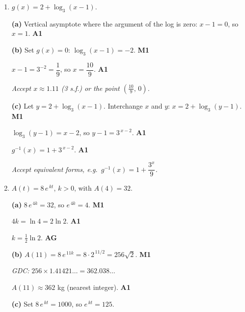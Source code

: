 \documentclass[12pt, twoside]{article}
\begin{document}
\begin{enumerate}[itemsep=0.3cm]
\newpage

\item[3.] [Maximum mark: 6]

$g(x) = 2 + \log_{3}(x - 1)$.

\medskip

\textbf{(a)} Vertical asymptote where the argument of the log is zero:
$x - 1 = 0$, so $x = 1$. \hfill \textbf{A1}

\medskip

\textbf{(b)} Set $g(x) = 0$: $\log_{3}(x - 1) = -2$. \hfill \textbf{M1}

$x - 1 = 3^{-2} = \dfrac{1}{9}$, so $x = \dfrac{10}{9}$. \hfill \textbf{A1}

\emph{Accept $x \approx 1.11$ (3 s.f.) or the point $(\tfrac{10}{9},\, 0)$.}

\medskip

\textbf{(c)} Let $y = 2 + \log_{3}(x - 1)$. Interchange $x$ and $y$:
$x = 2 + \log_{3}(y - 1)$. \hfill \textbf{M1}

$\log_{3}(y - 1) = x - 2$, so $y - 1 = 3^{\,x - 2}$. \hfill \textbf{A1}

$g^{-1}(x) = 1 + 3^{\,x - 2}$. \hfill \textbf{A1}

\emph{Accept equivalent forms, e.g.\ $g^{-1}(x) = 1 + \dfrac{3^{x}}{9}$.}

\newpage

\item[4.] [Maximum mark: 6]

$A(t) = 8\, e^{\,kt}$, $k > 0$, with $A(4) = 32$.

\medskip

\textbf{(a)} $8\, e^{\,4k} = 32$, so $e^{\,4k} = 4$. \hfill \textbf{M1}

$4k = \ln 4 = 2\ln 2$. \hfill \textbf{A1}

$k = \tfrac{1}{2}\ln 2$. \hfill \textbf{AG}

\medskip

\textbf{(b)} $A(11) = 8\, e^{\,11k} = 8 \cdot 2^{\,11/2} = 256\sqrt{2}$.
\hfill \textbf{M1}

\emph{GDC: } $256 \times 1.41421\ldots = 362.038\ldots$

$A(11) \approx 362$ kg (nearest integer). \hfill \textbf{A1}

\medskip

\textbf{(c)} Set $8\, e^{\,kt} = 1000$, so $e^{\,kt} = 125$.


\end{enumerate}
\end{document}

